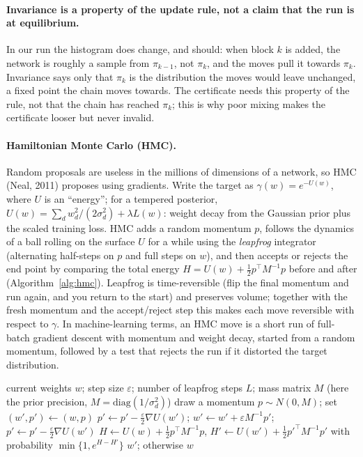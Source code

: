 \documentclass[11pt]{article}
\theoremstyle{definition}
\theoremstyle{remark}
\begin{document}
\paragraph{Invariance is a property of the update rule, not a claim that the run is at equilibrium.} In our run the
histogram does change, and should: when block $k$ is added, the network is roughly a sample from $\pi_{k-1}$, not $\pi_k$,
and the moves pull it towards $\pi_k$. Invariance says only that $\pi_k$ is the distribution the moves would leave
unchanged, a fixed point the chain moves towards. The certificate needs this property of the rule, not that the chain has
reached $\pi_k$; this is why poor mixing makes the certificate looser but never invalid.

\paragraph{Hamiltonian Monte Carlo (HMC).} Random proposals are useless in the millions of dimensions of a network, so
HMC (Neal, 2011) proposes using gradients. Write the target as $\gamma(w)=e^{-U(w)}$, where $U$ is an ``energy''; for a
tempered posterior, $U(w)=\sum_d w_d^2/(2\sigma_d^2)+\lambda L(w)$: weight decay from the Gaussian prior plus the scaled
training loss. HMC adds a random momentum $p$, follows the dynamics of a ball rolling on the surface $U$ for a while
using the \emph{leapfrog} integrator (alternating half-steps on $p$ and full steps on $w$), and then accepts or rejects
the end point by comparing the total energy $H=U(w)+\frac12p^\top M^{-1}p$ before and after
(Algorithm~\ref{alg:hmc}). Leapfrog is time-reversible (flip the final momentum and run again, and you return to the
start) and preserves volume; together with the fresh momentum and the accept/reject step this makes each move reversible
with respect to $\gamma$. In machine-learning terms, an HMC move is a short run of full-batch gradient descent with
momentum and weight decay, started from a random momentum, followed by a test that rejects the run if it distorted the
target distribution.

\begin{algorithm}[h]
\caption{One HMC move targeting $\gamma(w)=e^{-U(w)}$}\label{alg:hmc}
\begin{algorithmic}[1]
\Require current weights $w$; step size $\varepsilon$; number of leapfrog steps $L$; mass matrix $M$ (here the prior
precision, $M=\mathrm{diag}(1/\sigma_d^2)$)
\State draw a momentum $p\sim N(0,M)$; set $(w',p')\gets(w,p)$
 
  \State $p'\gets p'-\frac{\varepsilon}2\nabla U(w')$; \quad $w'\gets w'+\varepsilon M^{-1}p'$; \quad $p'\gets p'-\frac{\varepsilon}2\nabla U(w')$
\EndFor
\State $H\gets U(w)+\frac12p^\top M^{-1}p$, \quad $H'\gets U(w')+\frac12p'^\top M^{-1}p'$
\State with probability $\min\{1,e^{H-H'}\}$ \Return $w'$; otherwise \Return $w$
\end{algorithmic}
\end{algorithm}
\end{document}
